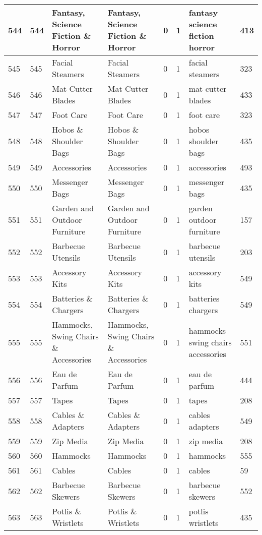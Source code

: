 \begin{longtable}{|l|l|l|l|l|l|l|l|}
544 & 544 & Fantasy, Science Fiction \& Horror & Fantasy, Science Fiction \& Horror & 0 & 1 & fantasy science fiction horror & 413 \\ \hline 
545 & 545 & Facial Steamers & Facial Steamers & 0 & 1 & facial steamers & 323 \\ \hline 
546 & 546 & Mat Cutter Blades & Mat Cutter Blades & 0 & 1 & mat cutter blades & 433 \\ \hline 
547 & 547 & Foot Care & Foot Care & 0 & 1 & foot care & 323 \\ \hline 
548 & 548 & Hobos \& Shoulder Bags & Hobos \& Shoulder Bags & 0 & 1 & hobos shoulder bags & 435 \\ \hline 
549 & 549 & Accessories & Accessories & 0 & 1 & accessories & 493 \\ \hline 
550 & 550 & Messenger Bags & Messenger Bags & 0 & 1 & messenger bags & 435 \\ \hline 
551 & 551 & Garden and Outdoor Furniture & Garden and Outdoor Furniture & 0 & 1 & garden outdoor furniture & 157 \\ \hline 
552 & 552 & Barbecue Utensils & Barbecue Utensils & 0 & 1 & barbecue utensils & 203 \\ \hline 
553 & 553 & Accessory Kits & Accessory Kits & 0 & 1 & accessory kits & 549 \\ \hline 
554 & 554 & Batteries \& Chargers & Batteries \& Chargers & 0 & 1 & batteries chargers & 549 \\ \hline 
555 & 555 & Hammocks, Swing Chairs \& Accessories & Hammocks, Swing Chairs \& Accessories & 0 & 1 & hammocks swing chairs accessories & 551 \\ \hline 
556 & 556 & Eau de Parfum & Eau de Parfum & 0 & 1 & eau de parfum & 444 \\ \hline 
557 & 557 & Tapes & Tapes & 0 & 1 & tapes & 208 \\ \hline 
558 & 558 & Cables \& Adapters & Cables \& Adapters & 0 & 1 & cables adapters & 549 \\ \hline 
559 & 559 & Zip Media & Zip Media & 0 & 1 & zip media & 208 \\ \hline 
560 & 560 & Hammocks & Hammocks & 0 & 1 & hammocks & 555 \\ \hline 
561 & 561 & Cables & Cables & 0 & 1 & cables & 59 \\ \hline 
562 & 562 & Barbecue Skewers & Barbecue Skewers & 0 & 1 & barbecue skewers & 552 \\ \hline 
563 & 563 & Potlis \& Wristlets & Potlis \& Wristlets & 0 & 1 & potlis wristlets & 435 \\ \hline 

\end{longtable}

